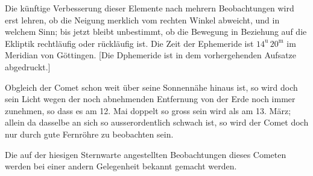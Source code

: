 \par\indent Die künftige Verbesserung dieser Elemente nach mehrern Beobachtungen wird erst lehren, ob
die Neigung merklich vom rechten Winkel abweicht, und in welchem Sinn; bis jetzt bleibt
unbestimmt, ob die Bewegung in Beziehung auf die Ekliptik rechtläufig oder rückläufig ist.
Die Zeit der Ephemeride ist $14^{\mathrm u}\,20^{\mathrm m}$ im Meridian von Göttingen. [Die Dphemeride ist
in dem vorhergehenden Aufsatze abgedruckt.]

\par\indent Obgleich der Comet schon weit über seine Sonnennähe hinaus ist, so wird doch sein Licht
wegen der noch abnehmenden Entfernung von der Erde noch immer zunehmen, so dass es am
12. Mai doppelt so gross sein wird als am 13. März; allein da dasselbe an sich so
ausserordentlich schwach ist, so wird der Comet doch nur durch gute Fernröhre zu beobachten
sein.

\par\indent Die auf der hiesigen Sternwarte angestellten Beobachtungen dieses Cometen werden bei einer
andern Gelegenheit bekannt gemacht werden.
